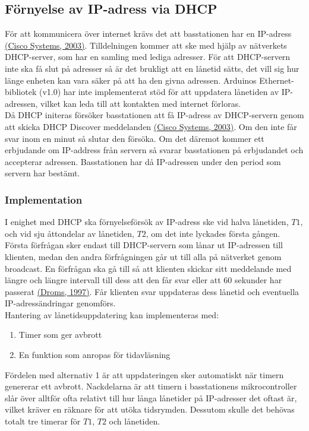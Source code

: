 \documentclass[a4paper,11pt]{article}
\begin{document}
\subsection{Förnyelse av IP-adress via DHCP}
För att kommunicera över internet krävs det att basstationen har en IP-adress \hyperref[cisco]{(Cisco Systems, 2003)}. Tilldelningen kommer att ske med hjälp av nätverkets DHCP-server, som har en samling med lediga adresser. För att DHCP-servern inte ska få slut på adresser så är det brukligt att en lånetid sätts, det vill sig hur länge enheten kan vara säker på att ha den givna adressen. Arduinos Ethernet-bibliotek (v1.0) har inte implementerat stöd för att uppdatera lånetiden av IP-adressen, vilket kan leda till att kontakten med internet förloras.\\

Då DHCP initeras försöker basstationen att få IP-adress av DHCP-servern genom att skicka DHCP Discover meddelanden \hyperref[cisco]{(Cisco Systems, 2003)}. Om den inte får svar inom en minut så slutar den försöka. Om det däremot kommer ett erbjudande om IP-address från servern så svarar basstationen på erbjudandet och accepterar adressen. Basstationen har då IP-adressen under den period som servern har bestämt.    

\subsubsection{Implementation}
I enighet med DHCP ska förnyelseförsök av IP-adress ske vid halva lånetiden, $T1$, och vid sju åttondelar av lånetiden, $T2$, om det inte lyckades första gången. Första förfrågan sker endast till DHCP-servern som lånar ut IP-adressen till klienten, medan den andra förfrågningen går ut till alla på nätverket genom broadcast. En förfrågan ska gå till så att klienten skickar sitt meddelande med längre och längre intervall till dess att den får svar eller att 60 sekunder har passerat \hyperref[droms]{(Droms, 1997)}. Får klienten svar uppdateras dess lånetid och eventuella IP-adressändringar genomförs.\\

Hantering av lånetidsuppdatering kan implementeras med:

	\begin{enumerate}
	\item Timer som ger avbrott
    \item En funktion som anropas för tidavläsning
	\end{enumerate}
	
Fördelen med alternativ 1 är att uppdateringen sker automatiskt när timern genererar ett avbrott. Nackdelarna är att timern i basstationens mikrocontroller slår över alltför ofta relativt till hur långa lånetider på IP-adresser det oftast är, vilket kräver en räknare för att utöka tidsrymden. Dessutom skulle det behövas totalt tre timerar för $T1$, $T2$ och lånetiden.\\
\end{document}
